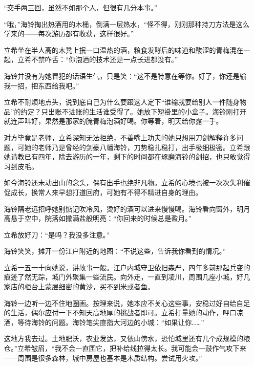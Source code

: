 \documentclass{article}
\begin{document}
“交手两三回，虽然不如那个人，但很有几分本事。”



“哦，”海铃掏出热酒用的木桶，倒满一层热水，“怪不得，刚刚那种持刀方法是这么学来的——每次游历都有收获，这样很好。”



立希坐在半人高的木凳上抿一口温热的酒，粮食发酵后的味道和酸涩的青梅混在一起，立希不禁咋舌：“你泡酒的技术还是一点长进都没有。”



海铃并没有为她冒犯的话语生气，只是笑：“这不是特意在等你。好了，你还是输我一招，把东西给我吧。”



立希不耐烦地点头，说到底自己为什么要跟这人定下“谁输就要给别人一件随身物品”的约定？只出账不进账的生活谁受得了。她放下短褂里的小盒子。海铃刚打开就连声叫好，果然是那家的腌青梅泡酒好喝。你等着，明天给你露一手。



对方毕竟是老师，立希深知无法拒绝，不善嘴上功夫的她只想用刀剑解释许多问题，可她的老师乃是曾经的剑豪八幡海铃，刀势稳扎稳打，出手极细极密。立希跟她请教已有四年，除去游历的一年，剩下的时间都在琢磨海铃的剑招，也只敢觉得习到皮毛。



如今海铃还未动出山的念头，偶有出手也绝非凡物。立希的心境也被一次次失利催促成长，换常人来早想打道回府，可她有不得不精进自身的理由。



海铃隔老远招呼她别惦记吹冷风，烫好的酒可以进来慢慢喝。海铃看向窗外，明月高悬于空中，院落如撒满盐般明亮：“你回来的时候总是盈月。”



立希放好刀：“是吗？我没多注意。”



海铃笑笑，摊开一份江户附近的地图：“不说这些，告诉我你看到的情况。”



立希一五一十向她说，讲故事一般。江户内城守卫依旧森严，四年多前那起兵变的痕迹了然无踪，城门外聚集一些流民。向外走，一直到凌川，周围几座小城，好几家店的柜台上蒙层细密的黄沙，买不到米或者鱼。



海铃一边听一边不住地圈画。按理来说，她本应不关心这些事，安稳过好自给自足的生活，偶尔应付一下不知天高地厚的挑战者即可。立希打量她的动作，呷口凉酒，等待海铃的问题。海铃笔尖直指大河边的小城：“如果让你……”



这地方我去过。土地肥沃，农业发达，又依山傍水，恐怕城里还有几个成规模的粮仓。”立希皱眉，“我不会一直围它，把补给线拉得太长。我可能会一鼓作气攻下来——周围是很多森林，城中房屋也基本是木质结构。尝试用火攻。”
\end{document}
